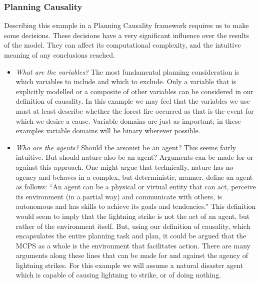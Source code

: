 \documentclass{article}
\theoremstyle{plain}
\theoremstyle{definition}
\begin{document}
\subsubsection*{Planning Causality}
Describing this example in a Planning Causality framework requires us to make some decisions. These decisions have a very significant influence over the results of the model. They can affect its computational complexity, and the intuitive meaning of any conclusions reached.

\begin{itemize}

\item \textit{What are the variables?} The most fundamental planning consideration is which variables to include and which to exclude. Only a variable that is explicitly modelled or a composite of other variables can be considered in our definition of causality. In this example we may feel that the variables we use must at least describe whether the forest fire occurred as that is the event for which we desire a cause. Variable domains are just as important; in these examples variable domains will be binary wherever possible.

\item \textit{Who are the agents?} Should the arsonist be an agent? This seems fairly intuitive. But should nature also be an agent? Arguments can be made for or against this approach. One might argue that technically, nature has no agency and behaves in a complex, but deterministic, manner. \citet{ferber1999multi} define an agent as follows: ``An agent can be a physical or virtual entity that can act, perceive its environment (in a partial way) and communicate with others, is autonomous and has skills to achieve its goals and tendencies." This definition would seem to imply that the lightning strike is not the act of an agent, but rather of the environment itself. But, using our definition of causality, which encapsulates the entire planning task and plan, it could be argued that the MCPS as a whole is the environment that facilitates action. There are many arguments along these lines that can be made for and against the agency of lightning strikes. For this example we will assume a natural disaster agent which is capable of causing lightning to strike, or of doing nothing.


\end{itemize}
\end{document}
